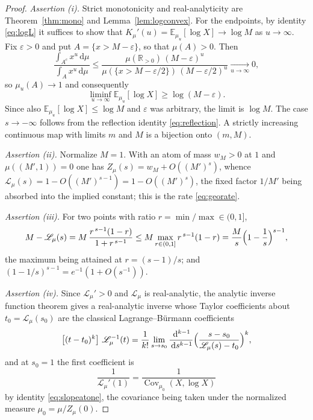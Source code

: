 \documentclass[sn-mathphys-num]{sn-jnl}
\theoremstyle{thmstyleone}%
\theoremstyle{thmstyletwo}%
\theoremstyle{thmstylethree}%
\theoremstyle{thmstyleone}%
\providecommand{\E}{\mathbb{E}}
\providecommand{\Cov}{\operatorname{Cov}}
\providecommand{\Rpos}{\mathbb{R}_{>0}}
\providecommand{\Leh}{\mathscr{L}}
\providecommand{\dd}{\,\mathrm{d}}
\begin{document}
\begin{appendices}
		
		\thmstatgen*
		
		\begin{proof}
			\emph{Assertion (i).} Strict monotonicity and real-analyticity
			are Theorem~\ref{thm:mono} and Lemma~\ref{lem:logconvex}. For
			the endpoints, by identity \eqref{eq:logL} it suffices to show
			that $K_\mu'(u)=\E_{\mu_u}[\log X]\to\log M$ as $u\to\infty$.
			Fix $\varepsilon>0$ and put $A=\{x>M-\varepsilon\}$, so that
			$\mu(A)>0$. Then
			\begin{equation}\label{eq:statgenratio}
				\frac{\int_{A^c}x^{u}\dd\mu}{\int_Ax^{u}\dd\mu}
				\le\frac{\mu(\Rpos)\,(M-\varepsilon)^{u}}
				{\mu(\{x>M-\varepsilon/2\})\,(M-\varepsilon/2)^{u}}
				\xrightarrow[u\to\infty]{}0,
			\end{equation}
			so $\mu_u(A)\to1$ and consequently
			\begin{equation}\label{eq:statgenliminf}
				\liminf_{u\to\infty}\E_{\mu_u}[\log X]
				\ge\log(M-\varepsilon).
			\end{equation}
			Since also $\E_{\mu_u}[\log X]\le\log M$ and $\varepsilon$ was
			arbitrary, the limit is $\log M$. The case $s\to-\infty$
			follows from the reflection identity \eqref{eq:reflection}. A
			strictly increasing continuous map with limits $m$ and $M$ is a
			bijection onto $(m,M)$.
			
			\emph{Assertion (ii).} Normalize $M=1$. With an atom of mass
			$w_M>0$ at $1$ and $\mu((M',1))=0$ one has
			$Z_\mu(s)=w_M+O((M')^{s})$, whence
			$\Leh_\mu(s)=1-O((M')^{s-1})=1-O((M')^{s})$, the fixed
			factor $1/M'$ being absorbed into the implied constant; this
			is the rate \eqref{eq:georate}.
			
			\emph{Assertion (iii).} For two points with ratio
			$r=\min/\max\in(0,1]$,
			\begin{equation}\label{eq:twopointexact}
				M-\Leh_\mu(s)=M\,\frac{r^{\,s-1}(1-r)}{1+r^{\,s-1}}
				\le M\max_{r\in(0,1]}r^{\,s-1}(1-r)
				=\frac{M}{s}\Bigl(1-\frac1s\Bigr)^{s-1},
			\end{equation}
			the maximum being attained at $r=(s-1)/s$; and
			$(1-1/s)^{s-1}=e^{-1}(1+O(s^{-1}))$.
			
			\emph{Assertion (iv).} Since $\Leh_\mu'>0$ and $\Leh_\mu$ is
			real-analytic, the analytic inverse function theorem gives a
			real-analytic inverse whose Taylor coefficients about
			$t_0=\Leh_\mu(s_0)$ are the classical Lagrange--B\"urmann
			coefficients
			\begin{equation}\label{eq:burmann}
				\bigl[(t-t_0)^k\bigr]\ \Leh_\mu^{-1}(t)
				=\frac1{k!}\lim_{s\to s_0}\frac{\dd^{k-1}}{\dd s^{k-1}}
				\Bigl(\frac{s-s_0}{\Leh_\mu(s)-t_0}\Bigr)^{k},
			\end{equation}
			and at $s_0=1$ the first coefficient is
			\begin{equation}\label{eq:firstburmann}
				\frac{1}{\Leh_\mu'(1)}
				=\frac{1}{\Cov_{\mu_0}(X,\log X)}
			\end{equation}
			by identity \eqref{eq:slopeatone}, the covariance being taken
			under the normalized measure $\mu_0=\mu/Z_\mu(0)$.
		\end{proof}
		

\end{appendices}
\end{document}
